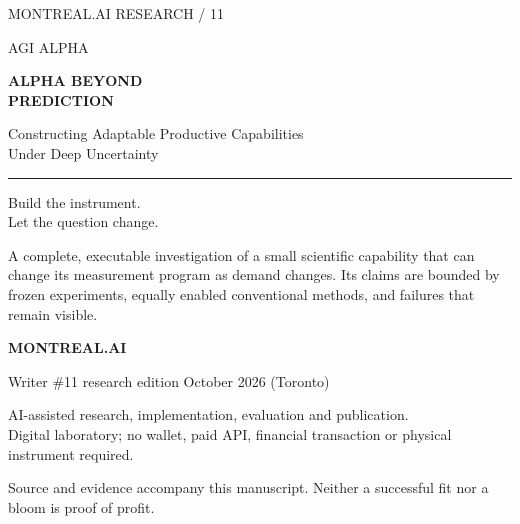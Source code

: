 \documentclass[11pt,letterpaper]{article}
\begin{document}
\color{Ink}
\hypersetup{pageanchor=false}
\begin{titlepage}
\thispagestyle{empty}
\vspace*{.22in}
{\sffamily\color{white}\large MONTREAL.AI \hfill RESEARCH / 11}\par
\vspace{.37in}
{\sffamily\color{white}\fontsize{18}{22}\selectfont AGI ALPHA}\par
\vspace{1.02in}
{\sffamily\bfseries\color{Cosmic}\fontsize{38}{41}\selectfont ALPHA BEYOND\\PREDICTION}\par
\vspace{.28in}
{\sffamily\fontsize{17}{23}\selectfont Constructing Adaptable Productive Capabilities\\Under Deep Uncertainty}\par
\vspace{.42in}
{\color{Teal}\rule{.9in}{2pt}}\par
\vspace{.18in}
{\fontsize{20}{27}\selectfont Build the instrument.\\Let the question change.}\par
\vspace{.3in}
\begin{finding}
A complete, executable investigation of a small scientific capability that can change its measurement program as demand changes. Its claims are bounded by frozen experiments, equally enabled conventional methods, and failures that remain visible.
\end{finding}
\vfill
{\sffamily\bfseries MONTREAL.AI}\par
{\small Writer \#11 research edition \;\textbullet{} October 2026 (Toronto)}\par
{\small AI-assisted research, implementation, evaluation and publication.\\Digital laboratory; no wallet, paid API, financial transaction or physical instrument required.}\par
\vspace{.15in}
{\footnotesize Source and evidence accompany this manuscript. Neither a successful fit nor a bloom is proof of profit.}
\end{titlepage}
\hypersetup{pageanchor=true}
\end{document}
